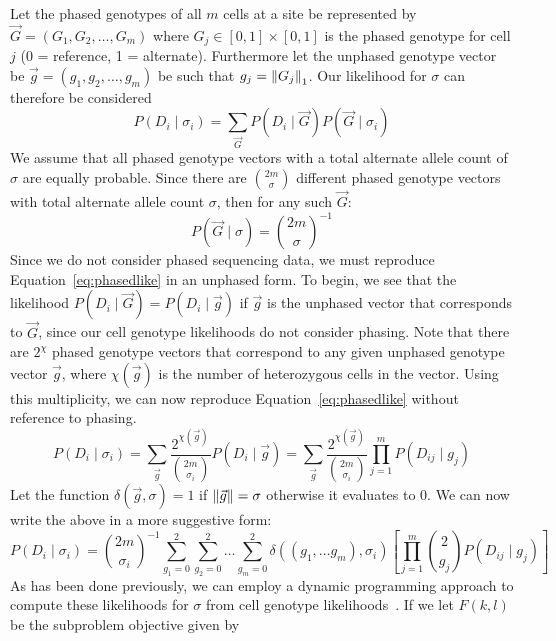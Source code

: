 \documentclass[../../main.tex]{subfiles}
\begin{document}
Let the phased genotypes of all $m$ cells at a site be represented by $\vec{G} = (G_1,G_2,\dots,G_m)$ where $G_j\in [0,1]\times[0,1]$ is the phased genotype for cell $j$ (0 = reference, 1 = alternate). Furthermore let the unphased genotype vector be $\vec{g} = (g_1,g_2,\dots,g_m)$ be such that $g_j = \left\lVert G_j\right\rVert_1$. Our likelihood for $\sigma$ can therefore be considered
\begin{equation} \label{eq:phasedlike}
P(D_i\mid\sigma_i) = \sum_{\vec{G}} P(D_i \mid \vec{G}) P(\vec{G} \mid \sigma_i)
\end{equation}
We assume that all phased genotype vectors with a total alternate allele count of $\sigma$ are equally probable. Since there are $\binom{2m}{\sigma}$ different phased genotype vectors with total alternate allele count $\sigma$, then for any such $\vec{G}$:
\begin{equation*}
P(\vec{G}\mid \sigma) = \binom{2m}{\sigma}^{-1}
\end{equation*}
Since we do not consider phased sequencing data, we must reproduce Equation~\eqref{eq:phasedlike} in an unphased form. To begin, we see that the likelihood $P(D_i\mid \vec{G}) = P(D_i\mid \vec{g})$ if $\vec{g}$ is the unphased vector that corresponds to $\vec{G}$, since our cell genotype likelihoods do not consider phasing. Note that there are $2^\chi$ phased genotype vectors that correspond to any given unphased genotype vector $\vec{g}$, where $\chi(\vec{g})$ is the number of heterozygous cells in the vector. Using this multiplicity, we can now reproduce Equation~\eqref{eq:phasedlike} without reference to phasing.
\begin{equation*}
P(D_i\mid\sigma_i) = \sum_{\vec{g}} \frac{2^{\chi(\vec{g})}}{\binom{2m}{\sigma_i}} P(D_i\mid\vec{g}) = \sum_{\vec{g}} \frac{2^{\chi(\vec{g})}}{\binom{2m}{\sigma_i}} \prod_{j=1}^{m}P(D_{ij}\mid g_{j})
\end{equation*}
Let the function $\delta(\vec{g},\sigma) = 1$ if $\left\lVert\vec{g}\right\rVert=\sigma$ otherwise it evaluates to 0. We can now write the above in a more suggestive form:
\begin{equation}\label{eq:sitelikelihood}
P(D_i\mid\sigma_i) = \binom{2m}{\sigma_i}^{-1}\sum_{g_1=0}^2\sum_{g_2=0}^2\dots\sum_{g_m=0}^2 \delta((g_1,\dots g_m),\sigma_i)\left[\prod_{j=1}^{m}\binom{2}{g_j}P(D_{ij}\mid g_{j})\right]
\end{equation}
As has been done previously, we can employ a dynamic programming approach to compute these likelihoods for $\sigma$ from cell genotype likelihoods~\cite{monovar, sciphi, ledurbin}. If we let $F(k,l)$ be the subproblem objective given by
\end{document}
